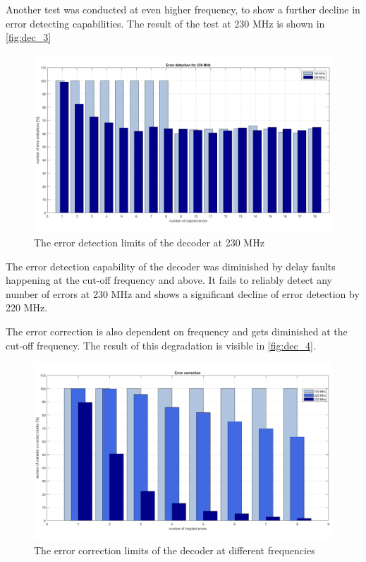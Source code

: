 Another test was conducted at even higher frequency, to show a further decline in error detecting capabilities. The result of the test at 230 MHz is shown in \autoref{fig:dec_3}

\begin{figure}[h]
\centering
\includegraphics[width=\textwidth]{figures/max_detection_230.png}
\caption{The error detection limits of the decoder at 230 MHz}
\label{fig:dec_3}
\end{figure}

The error detection capability of the decoder was diminished by delay faults happening at the cut-off frequency and above. It fails to reliably detect any number of errors at 230 MHz and shows a significant decline of error detection by 220 MHz.

The error correction is also dependent on frequency and gets diminished at the cut-off frequency. The result of this degradation is visible in \autoref{fig:dec_4}.

\begin{figure}[h]
\centering
\includegraphics[width=\textwidth]{figures/max_correction.png}
\caption{The error correction limits of the decoder at different frequencies}
\label{fig:dec_4}
\end{figure}

